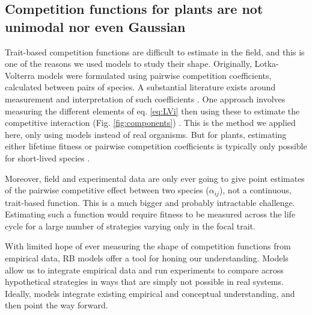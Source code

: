 \documentclass[a4paper,11pt]{article}
\begin{document}
\subsection{Competition functions for plants are not unimodal nor even Gaussian}

Trait-based competition functions are difficult to estimate in the field, and this is one of the reasons we used models to study their shape. Originally, Lotka-Volterra models were formulated using pairwise competition coefficients, calculated between pairs of species. A substantial literature exists around measurement and interpretation of such coefficients \citep[e.g.][]{Ricklefs-1973, Abrams-1980, Law-1997a,Freckleton-2001, Kraft-2015}. One approach involves measuring the different elements of eq. \ref{eq:LVi} then using these to estimate the competitive interaction (Fig. \ref{fig:components}) \citep{Ricklefs-1973}. This is the method we applied here, only using models instead of real organisms. But for plants, estimating either lifetime fitness or pairwise competition coefficients is typically only possible for short-lived species \citep{Kraft-2015, Mayfield-2017, Law-1997,Freckleton-2001,Laughlin-2020}. 

Moreover, field and experimental data are only ever going to give point estimates of the pairwise competitive effect between two species ($\alpha_{ij}$), not a continuous, trait-based function. This is a much bigger and probably intractable challenge. Estimating such a function would require fitness to be measured across the life cycle for a large number of strategies varying only in the focal trait. 

With limited hope of ever measuring the shape of competition functions from empirical data, RB models offer a tool for honing our understanding. Models allow us to integrate empirical data and run experiments to compare across hypothetical strategies in ways that are simply not possible in real systems. Ideally, models integrate existing empirical and conceptual understanding, and then point the way forward.
\end{document}
